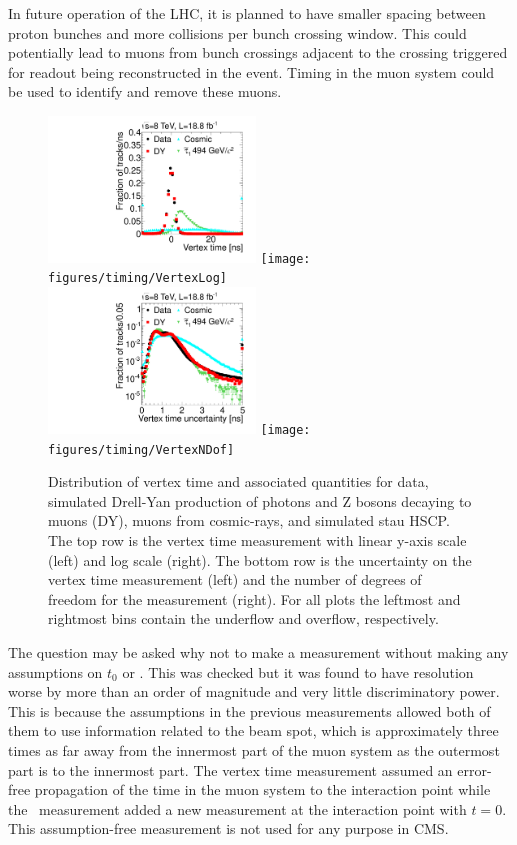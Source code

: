 In future operation of the LHC, it is planned to have smaller spacing between proton bunches and more collisions per bunch crossing window.
This could potentially lead to muons from bunch crossings adjacent to the crossing triggered for readout being reconstructed in the event.
Timing in the muon system could be used to identify and remove these muons.

\begin{figure}
  \begin{center}
      \includegraphics[width=0.49\textwidth]{figures/timing/Vertex}
      \texttt{[image: figures/timing/VertexLog]} \\
      \includegraphics[width=0.49\textwidth]{figures/timing/VertexErr}
      \texttt{[image: figures/timing/VertexNDof]} \\
      \caption[Distribution of vertex time and associated quantities.]
      {Distribution of vertex time and associated quantities for data,
simulated Drell-Yan production of photons and Z bosons decaying to muons (DY), muons from cosmic-rays, and simulated stau HSCP.
The top row is the vertex time measurement with linear y-axis scale (left) and log scale (right).
The bottom row is the uncertainty on the vertex time measurement (left) and the number of degrees of freedom for the measurement (right).
For all plots the leftmost and rightmost bins contain the underflow and overflow, respectively.
        }
      \label{fig:vertextime}
  \end{center}
\end{figure}

The question may be asked why not to make a measurement without making any assumptions on $t_0$ or \invbeta. This was checked but it was found to have
resolution worse by more than an order of magnitude and very little discriminatory power.
This is because the assumptions in the previous measurements allowed both of them to use information
related to the beam spot, which is approximately three times as far away from the innermost part of the muon system as the outermost part is to the innermost part.
The vertex time measurement assumed an error-free propagation of the time in the muon system to the interaction point while the \invbeta\ measurement
added a new measurement at the interaction point with $t = 0$. This assumption-free measurement is not used for any purpose in CMS.

